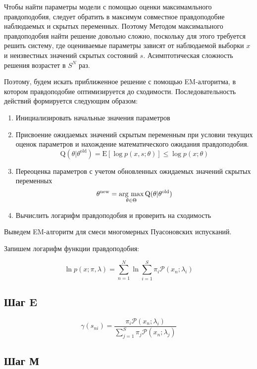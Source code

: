 \documentclass{matmex-diploma}
\begin{document}

Чтобы найти параметры модели с помощью оценки максимамльного правдоподобия, следует обратить в максимум совместное правдоподобие наблюдаемых и скрытых переменных. Поэтому Методом максимального правдоподобия найти решение довольно сложно, поскольку для этого требуется решить систему, где оцениваемые параметры зависят от наблюдаемой выборки $x$ и неизвестных значений скрытых состояний $s$. Асимптотическая сложность решения возрастет в $S^N$ раз.

Поэтому, будем искать приближенное решение с помощью EM-алгоритма, в котором правдоподобие оптимизируется до сходимости. Последовательность действий формируется следующим образом\cite{book:Bishop}:
\begin{enumerate}
\item
Инициализировать начальные значения параметров
\item
Присвоение ожидаемых значений скрытым переменным при условии текущих оценок параметров и нахождение математического ожидания правдоподобия.
$$\mathrm{Q}(\theta|\theta^{\operatorname{old}})
=\mathrm{E}[\log p(x,s;\theta)]\le \log p(x;\theta)$$
\item
Переоценка параметров с учетом обновленных ожидаемых значений скрытых переменных
$$\theta^{\operatorname{new}}=\mathop{\rm arg~max}\limits_{\theta \in \Theta} \mathrm{Q}(\theta|\theta^{\operatorname{old}})$$
\item
Вычислить логарифм правдоподобия и проверить на сходимость
\end{enumerate}

Выведем EM-алгоритм для смеси многомерных Пуасоновских испусканий.

Запишем логарифм функции правдоподобия:

\begin{equation}
\ln p(x;\pi,\lambda) = \sum_{n=1}^N \ln{\sum_{i=1}^S} \pi_i \mathcal{P}(x_n;\lambda_i)
\end{equation}

\subsection*{Шаг E}

\begin{equation}
\gamma(s_{ni}) = \frac{\pi_i\mathcal{P}(x_n;\lambda_i)}{\sum_{j=1}^S\pi_j\mathcal{P}(x_n;\lambda_j)}
\end{equation}

\subsection*{Шаг М}
\end{document}
